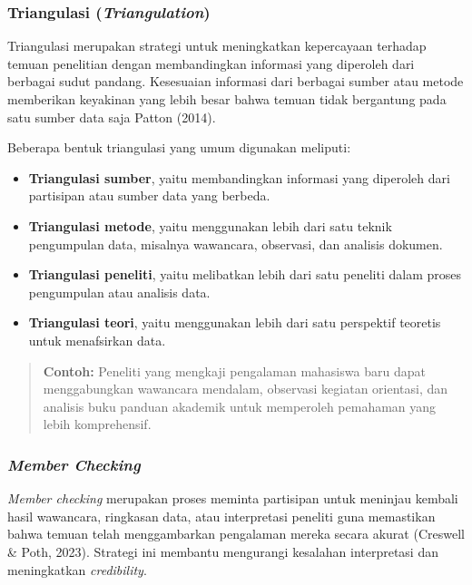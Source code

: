 \documentclass[
  indonesian,
  letterpaper,
  DIV=11,
  numbers=noendperiod]{scrreprt}
\providecommand{\tightlist}{%
  \setlength{\itemsep}{0pt}\setlength{\parskip}{0pt}}
\begin{document}
\subsubsection{\texorpdfstring{Triangulasi
(\emph{Triangulation})}{Triangulasi (Triangulation)}}\label{triangulasi-triangulation}

Triangulasi merupakan strategi untuk meningkatkan kepercayaan terhadap
temuan penelitian dengan membandingkan informasi yang diperoleh dari
berbagai sudut pandang. Kesesuaian informasi dari berbagai sumber atau
metode memberikan keyakinan yang lebih besar bahwa temuan tidak
bergantung pada satu sumber data saja Patton (2014).

Beberapa bentuk triangulasi yang umum digunakan meliputi:

\begin{itemize}
\tightlist
\item
  \textbf{Triangulasi sumber}, yaitu membandingkan informasi yang
  diperoleh dari partisipan atau sumber data yang berbeda.
\item
  \textbf{Triangulasi metode}, yaitu menggunakan lebih dari satu teknik
  pengumpulan data, misalnya wawancara, observasi, dan analisis dokumen.
\item
  \textbf{Triangulasi peneliti}, yaitu melibatkan lebih dari satu
  peneliti dalam proses pengumpulan atau analisis data.
\item
  \textbf{Triangulasi teori}, yaitu menggunakan lebih dari satu
  perspektif teoretis untuk menafsirkan data.
\end{itemize}

\begin{quote}
\textbf{Contoh:} Peneliti yang mengkaji pengalaman mahasiswa baru dapat
menggabungkan wawancara mendalam, observasi kegiatan orientasi, dan
analisis buku panduan akademik untuk memperoleh pemahaman yang lebih
komprehensif.
\end{quote}

\subsubsection{\texorpdfstring{\emph{Member
Checking}}{Member Checking}}\label{member-checking}

\emph{Member checking} merupakan proses meminta partisipan untuk
meninjau kembali hasil wawancara, ringkasan data, atau interpretasi
peneliti guna memastikan bahwa temuan telah menggambarkan pengalaman
mereka secara akurat (Creswell \& Poth, 2023). Strategi ini membantu
mengurangi kesalahan interpretasi dan meningkatkan \emph{credibility}.
\end{document}
